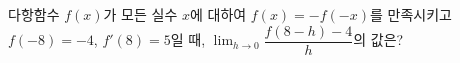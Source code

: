 다항함수 $f(x)$가 모든 실수 $x$에 대하여 $f(x)=-f(-x)$를 만족시키고 $f(-8)=-4$, $f'(8)=5$일 때, $\displaystyle\lim_{h\to 0}\dfrac{f(8-h)-4}{h}$의 값은?

